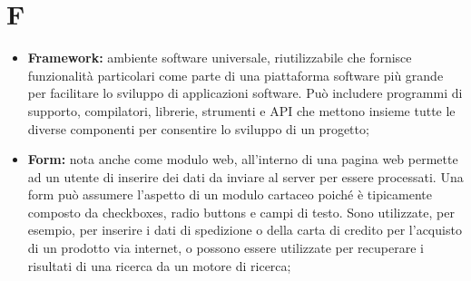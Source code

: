 %


\section*{F} %
\label{sec:f}
	\begin{itemize}
		\item \textbf{Framework:} ambiente software universale, riutilizzabile che fornisce funzionalità particolari come parte di una piattaforma software più grande per facilitare lo sviluppo di applicazioni software. Può includere programmi di supporto, compilatori, librerie, strumenti e API che mettono insieme tutte le diverse componenti per consentire lo sviluppo di un progetto;
		\item \textbf{Form:} nota anche come modulo web, all'interno di una pagina web permette ad un utente di inserire dei dati da inviare al server per essere processati. Una form può assumere l'aspetto di un modulo cartaceo poiché è tipicamente composto da checkboxes, radio buttons e campi di testo. Sono utilizzate, per esempio, per inserire i dati di spedizione o della carta di credito per l'acquisto di un prodotto via internet, o possono essere utilizzate per recuperare i risultati di una ricerca da un motore di ricerca;
	\end{itemize}
\pagebreak


